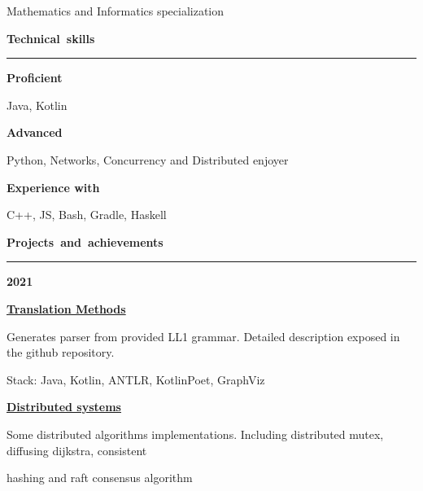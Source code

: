 \documentclass[11pt,a4paper]{report}
\begin{document}
\vspace{5px}
\hspace{10px}
Mathematics and Informatics specialization  \\
\hfill


\par\hbox{\Large\textbf{Technical skills}}\kern5pt\hrule
\vspace{10px}


\textbf{Proficient} 

\vspace{5px}
\hspace{10px}
Java, Kotlin
\vspace{5px}

\textbf{Advanced}

\vspace{5px}
\hspace{10px}
Python, Networks, Concurrency and Distributed enjoyer
\vspace{5px}

\textbf{Experience with}

\vspace{5px}
\hspace{10px}
C++, JS, Bash, Gradle, Haskell
\vspace{10px}


\par\hbox{\Large\textbf{Projects and achievements}}\kern5pt\hrule

\vspace{10px}
\textbf{\Large{2021}}

\hspace{10px} \textbf{\href{https://github.com/Kvel4/Translation-Methods}{Translation Methods}}

\hspace{20px} Generates parser from provided LL1 grammar. Detailed description exposed in the github repository.

\hspace{20px} Stack: Java, Kotlin, ANTLR, KotlinPoet, GraphViz

\vspace{10px}

\hspace{10px} \textbf{\href{https://github.com/Kvel4/itmo-pds}{Distributed systems}}

\hspace{20px} Some distributed algorithms implementations. Including distributed mutex, diffusing dijkstra, consistent 

\hspace{20px} hashing and raft consensus algorithm 
\end{document}
